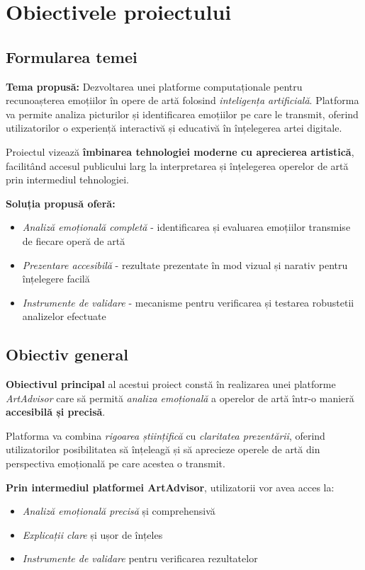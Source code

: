 \chapter{Obiectivele proiectului}
\label{ch:obiective}

\section{Formularea temei}
\label{sec:obiective-tema}

\textbf{Tema propusă:} Dezvoltarea unei platforme computaționale pentru recunoașterea emoțiilor în opere de artă folosind \emph{inteligența artificială}. Platforma va permite analiza picturilor și identificarea emoțiilor pe care le transmit, oferind utilizatorilor o experiență interactivă și educativă în înțelegerea artei digitale.

Proiectul vizează \textbf{îmbinarea tehnologiei moderne cu aprecierea artistică}, facilitând accesul publicului larg la interpretarea și înțelegerea operelor de artă prin intermediul tehnologiei.

\textbf{Soluția propusă oferă:}
\begin{itemize}
  \item \textit{Analiză emoțională completă} - identificarea și evaluarea emoțiilor transmise de fiecare operă de artă
  \item \textit{Prezentare accesibilă} - rezultate prezentate în mod vizual și narativ pentru înțelegere facilă
  \item \textit{Instrumente de validare} - mecanisme pentru verificarea și testarea robustetii analizelor efectuate
\end{itemize}

\section{Obiectiv general}
\label{sec:obiectiv-general}

\textbf{Obiectivul principal} al acestui proiect constă în realizarea unei platforme \emph{ArtAdvisor} care să permită \textit{analiza emoțională} a operelor de artă într-o manieră \textbf{accesibilă și precisă}.

Platforma va combina \emph{rigoarea științifică} cu \textit{claritatea prezentării}, oferind utilizatorilor posibilitatea să înțeleagă și să aprecieze operele de artă din perspectiva emoțională pe care acestea o transmit.

\textbf{Prin intermediul platformei ArtAdvisor}, utilizatorii vor avea acces la:
\begin{itemize}
  \item \textit{Analiză emoțională precisă} și comprehensivă
  \item \textit{Explicații clare} și ușor de înțeles
  \item \textit{Instrumente de validare} pentru verificarea rezultatelor
\end{itemize}

